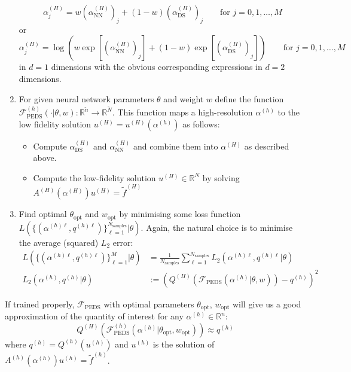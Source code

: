 \documentclass[11pt]{article}
\begin{document}
\begin{enumerate}
    \begin{equation}
        \alpha^{(H)}_j = w (\alpha^{(H)}_{\text{NN}})_j + (1-w) (\alpha^{(H)}_{\text{DS}})_j \qquad\text{for $j=0,1,\dots,M$}
    \end{equation}
    or
    \begin{equation}
        \alpha^{(H)}_j = \log\left(w \exp[(\alpha^{(H)}_{\text{NN}})_j] + (1-w) \exp[(\alpha^{(H)}_{\text{DS}})_j]\right) \qquad\text{for $j=0,1,\dots,M$}
    \end{equation}
    in $d=1$ dimensions with the obvious corresponding expressions in $d=2$ dimensions.
    \item For given neural network parameters $\theta$ and weight $w$ define the function $\mathcal{F}^{(h)}_{\text{PEDS}}(\cdot|\theta,w):\mathbb{R}^{\widetilde{n}}\rightarrow \mathbb{R}^{\widetilde{N}}$. This function maps a high-resolution $\alpha^{(h)}$ to the low fidelity solution $u^{(H)}=u^{(H)}(\alpha^{(h)})$ as follows:
    \begin{itemize}
        \item Compute $\alpha^{(H)}_{\text{DS}}$ and $\alpha^{(H)}_{\text{NN}}$ and combine them into $\alpha^{(H)}$ as described above.
        \item Compute the low-fidelity solution $u^{(H)}\in\mathbb{R}^N$ by solving $A^{(H)}(\alpha^{(H)})u^{(H)}=\widetilde{f}^{(H)}$
    \end{itemize}
    \item Find optimal $\theta_{\text{opt}}$ and $w_{\text{opt}}$ by minimising some loss function $L(\{(\alpha^{(h)\ell},q^{(h)\ell})\}_{\ell=1}^{N_{\text{samples}}}|\theta)$. Again, the natural choice is to minimise the average (squared) $L_2$ error:
\begin{equation}
    \begin{aligned}
    L(\{(\alpha^{(h)\ell},q^{(h)\ell})\}_{\ell=1}^{M}|\theta) &= \frac{1}{N_{\text{samples}}}\sum_{\ell=1}^{N_{\text{samples}}} L_2(\alpha^{(h)\ell},q^{(h)\ell}|\theta)\\
    L_2(\alpha^{(h)},q^{(h)}|\theta) &:= \left(Q^{(H)}\left(\mathcal{F}_{\text{PEDS}}(\alpha^{(h)}|\theta,w)\right) - q^{(h)}\right)^2
    \end{aligned}
\end{equation}
\end{enumerate}
If trained properly, $\mathcal{F}_{\text{PEDS}}$ with optimal parameters $\theta_{\text{opt}}$, $w_{\text{opt}}$ will give us a good approximation of the quantity of interest for any $\alpha^{(h)}\in\mathbb{R}^{n}$:
\begin{equation}
    Q^{(H)}\left(\mathcal{F}^{(h)}_{\text{PEDS}}(\alpha^{(h)}|\theta_{\text{opt}},w_{\text{opt}})\right) \approx q^{(h)}
\end{equation}
where $q^{(h)}=Q^{(h)}(u^{(h)})$ and $u^{(h)}$ is the solution of $A^{(h)}(\alpha^{(h)}) u^{(h)}=\widetilde{f}^{(h)}$.
\appendix
\end{document}
